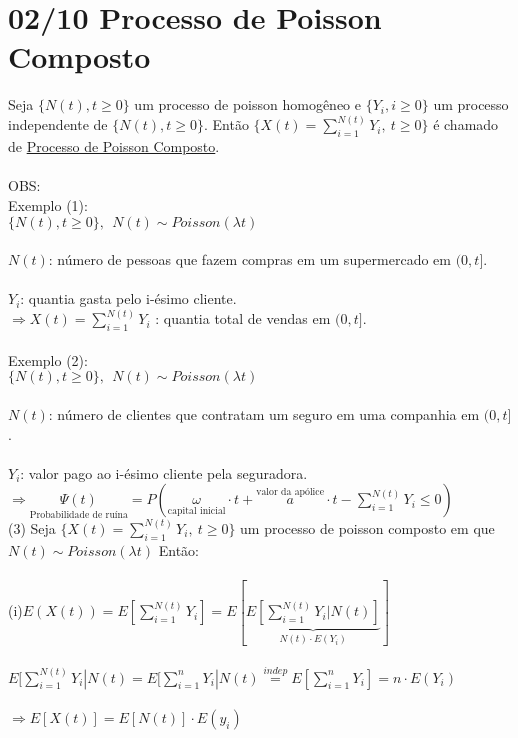 \documentclass[a4paper,12pt]{article}
\begin{document}
\section*{02/10  Processo de Poisson Composto}
Seja $\{N(t),t\ge0\}$ um processo de poisson homogêneo e $\{Y_i,i\ge0\}$ um processo independente de $\{N(t),t\ge0\}$. Então
$\{X(t)=\sum\limits_{i=1}^{N(t)}Y_i, \ t\ge0\}$ é chamado de \underline{Processo de Poisson Composto}.
\\
\\
OBS:\\
Exemplo (1):\\
$\{N(t),t\ge0\},\ \ N(t)\sim Poisson(\lambda t)$\\ 
\\
$N(t)$: número de pessoas que fazem compras em um supermercado em $(0,t]$.\\
\\
$Y_i$: quantia gasta pelo i-ésimo cliente.\\
$\Rightarrow X(t)=\sum\limits_{i=1}^{N(t)}Y_i$ : quantia total de vendas em $(0,t]$.
\\
\\
Exemplo (2):\\
$\{N(t),t\ge0\},\ \ N(t)\sim Poisson(\lambda t)$\\ 
\\
$N(t)$: número de clientes que contratam um seguro em uma companhia em $(0,t]$.\\
\\
$Y_i$: valor pago ao i-ésimo cliente pela seguradora.\\
$\Rightarrow \underset{\text{Probabilidade de ruína}}{\Psi(t)}=P\left(\underset{\text{capital inicial}}{\omega }\cdot t+\overset{\text{valor da apólice}}{a}\cdot t-\sum\limits_{i=1}^{N(t)}Y_i\le 0 \right)$ \\
\newpage
(3) Seja $\{X(t)=\sum\limits_{i=1}^{N(t)}Y_i, \ t\ge0\}$ um processo de poisson composto em que $N(t)\sim Poisson(\lambda t)$
Então:\\
\\
(i)$E(X(t))=E[\sum\limits_{i=1}^{N(t)}Y_i]=E[\underbrace{E[\sum\limits_{i=1}^{N(t)}Y_i|N(t)]}_{N(t)\cdot E(Y_i)}]$\\
\\
$E[\sum\limits_{i=1}^{N(t)}Y_i|N(t)=E[\sum\limits_{i=1}^{n}Y_i|N(t)\overset{indep}{=}E[\sum\limits_{i=1}^{n}Y_i]=n\cdot E(Y_i)$\\
\\
$\Rightarrow E[X(t)]=E[N(t)]\cdot E(y_i)$
\\
\\
\end{document}

